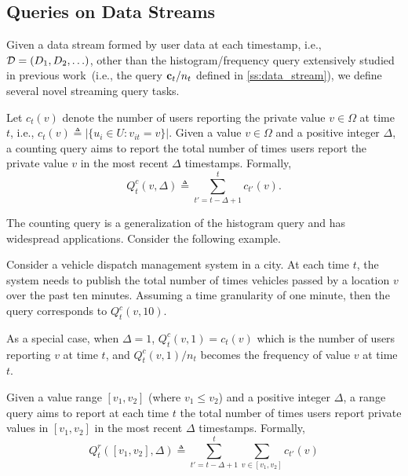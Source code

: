 \subsection{Queries on Data Streams}
\label{ss:queries}

Given a data stream formed by user data at each timestamp, i.e., $\mathcal{D} =
(D_1,D_2,\ldots)$, other than the histogram/frequency query extensively studied
in previous work~\cite{Kellaris2014, Ren2022}(i.e., the query $\mathbf{c}_t/n_t$ defined in \cref{ss:data_stream}), we
define several novel streaming query tasks.

\begin{definition}
  Let $c_t(v)$ denote the number of users reporting the private value $v\in\Omega$ at
  time $t$, i.e., $c_t(v)\triangleq |\{u_i\in U\colon v_{it}=v\}|$.
  Given a value $v\in\Omega$ and a positive integer $\Delta$, a counting query
  aims to report the total number of times users report the private value $v$ in
  the most recent $\Delta$ timestamps.
  Formally,
  \[
    Q_t^c(v,\Delta)\triangleq \sum_{t'=t-\Delta +1}^t c_{t'}(v).
  \]
\end{definition}

The counting query is a generalization of the histogram query and has widespread
applications.
Consider the following example.

\begin{example}\label{exam:vehicle}
  Consider a vehicle dispatch management system in a city.
  At each time $t$, the system needs to publish the total number of times
  vehicles passed by a location $v$ over the past ten minutes.
  Assuming a time granularity of one minute, then the query corresponds to
  $Q_t^c(v, 10)$.
\end{example}

As a special case, when $\Delta=1$, $Q_t^c(v,1)=c_t(v)$ which is the number of
users reporting $v$ at time $t$, and $Q_t^c(v,1)/n_t$ becomes the frequency of
value $v$ at time $t$.

\begin{definition}
  Given a value range $[v_1, v_2]$ (where $v_1\leq v_2$) and a positive integer
  $\Delta$, a range query aims to report at each time $t$ the total number of
  times users report private values in $[v_1, v_2]$ in the most recent
  $\Delta$ timestamps.
  Formally,
  \[
    Q_t^r([v_1, v_2],\Delta)\triangleq
    \sum_{t'=t-\Delta +1}^t\sum_{v\in[v_1,v_2]} c_{t'}(v)
  \]
\end{definition}

